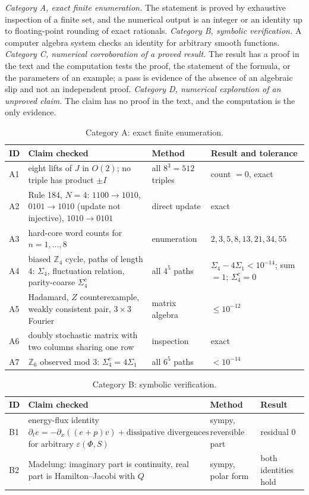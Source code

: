 \documentclass[11pt,oneside]{book}
\theoremstyle{definition}
\theoremstyle{remark}
\begin{document}
\emph{Category A, exact finite enumeration.} The statement is proved by exhaustive inspection of a finite set, and the numerical output is an integer or an identity up to floating-point rounding of exact rationals. \emph{Category B, symbolic verification.} A computer algebra system checks an identity for arbitrary smooth functions. \emph{Category C, numerical corroboration of a proved result.} The result has a proof in the text and the computation tests the proof, the statement of the formula, or the parameters of an example; a pass is evidence of the absence of an algebraic slip and not an independent proof. \emph{Category D, numerical exploration of an unproved claim.} The claim has no proof in the text, and the computation is the only evidence.

\begin{table}[h]
\centering
\scriptsize
\begin{tabular}{p{0.8cm}p{5.2cm}p{3.2cm}p{3.3cm}}
\hline
ID & Claim checked & Method & Result and tolerance \\
\hline
A1 & eight lifts of $J$ in $O(2)$; no triple has product $\pm I$ & all $8^3=512$ triples & count $=0$, exact \\
A2 & Rule 184, $N=4$: $1100\to1010$, $0101\to1010$ (update not injective), $1010\to0101$ & direct update & exact \\
A3 & hard-core word counts for $n=1,\dots,8$ & enumeration & $2,3,5,8,13,21,34,55$ \\
A4 & biased $\mathbb Z_4$ cycle, paths of length $4$: $\Sigma_4$, fluctuation relation, parity-coarse $\Sigma_4^c$ & all $4^5$ paths & $\Sigma_4-4\Sigma_1<10^{-14}$; sum $=1$; $\Sigma_4^c=0$ \\
A5 & Hadamard, $Z$ counterexample, weakly consistent pair, $3\times3$ Fourier & matrix algebra & $\leq10^{-12}$ \\
A6 & doubly stochastic matrix with two columns sharing one row & inspection & exact \\
A7 & $\mathbb Z_6$ observed mod $3$: $\Sigma_4^c=4\Sigma_1$ & all $6^5$ paths & $<10^{-14}$ \\
\hline
\end{tabular}
\caption{Category A: exact finite enumeration.}
\end{table}

\begin{table}[h]
\centering
\scriptsize
\begin{tabular}{p{0.8cm}p{5.2cm}p{3.2cm}p{3.3cm}}
\hline
ID & Claim checked & Method & Result \\
\hline
B1 & energy-flux identity $\partial_te=-\partial_x((e+p)v)+\text{dissipative divergences}$ for arbitrary $\varepsilon(\Phi,S)$ & sympy, reversible part & residual $0$ \\
B2 & Madelung: imaginary part is continuity, real part is Hamilton--Jacobi with $Q$ & sympy, polar form & both identities hold \\
\hline
\end{tabular}
\caption{Category B: symbolic verification.}
\end{table}
\end{document}
